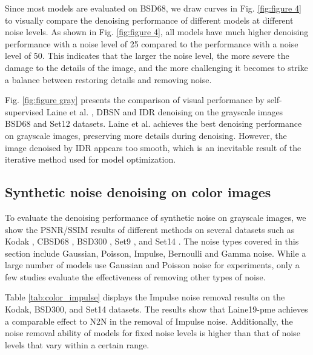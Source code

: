 \documentclass[conference]{IEEEtran}
\begin{document}
Since most models are evaluated on BSD68\cite{roth2005fields}, we draw curves in Fig. \ref{fig:figure 4} to visually compare the denoising performance of different models at different noise levels. As shown in Fig. \ref{fig:figure 4}, all models have much higher denoising performance with a noise level of 25 compared to the performance with a noise level of 50. This indicates that the larger the noise level, the more severe the damage to the details of the image, and the more challenging it becomes to strike a balance between restoring details and removing noise. 

Fig. \ref{fig:figure gray} presents the comparison of visual performance by self-supervised Laine et al. \cite{laine2019high}, DBSN \cite{wu2020unpaired} and IDR \cite{zhang2022idr} denoising on the grayscale images BSD68 \cite{roth2005fields} and Set12 \cite{dabov2007image} datasets. Laine et al. achieves the best denoising performance on grayscale images, preserving more details during denoising. However, the image denoised by IDR appears too smooth, which is an inevitable result of the iterative method used for model optimization.

\subsection{Synthetic noise denoising on color images}

To evaluate the denoising performance of synthetic noise on grayscale images, we show the PSNR/SSIM results of different methods on several datasets such as Kodak \cite{franzen1999kodak}, CBSD68 \cite{roth2005fields}, BSD300 \cite{martin2001database}, Set9 \cite{ulyanov2018deep}, and Set14 \cite{zeyde2012single}. The noise types covered in this section include Gaussian, Poisson, Impulse, Bernoulli and Gamma noise. While a large number of models use Gaussian and Poisson noise for experiments, only a few studies evaluate the effectiveness of removing other types of noise.

Table \ref{tab:color_impulse} displays the Impulse noise removal results on the Kodak\cite{franzen1999kodak}, BSD300\cite{martin2001database}, and Set14\cite{zeyde2012single} datasets. The results show that Laine19-pme \cite{laine2019high} achieves a comparable effect to N2N \cite{lehtinen2018noise2noise} in the removal of Impulse noise. Additionally, the noise removal ability of models for fixed noise levels is higher than that of noise levels that vary within a certain range.
\end{document}
